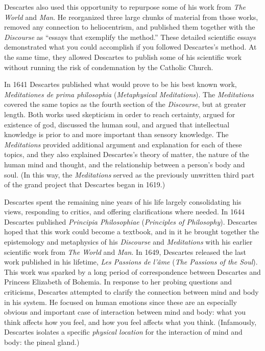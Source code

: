 Descartes also used this opportunity to repurpose some of his work from \textit{The World} and \textit{Man}. He reorganized three large chunks of material from those works, removed any connection to heliocentrism, and published them together with the \textit{Discourse} as ``essays that exemplify the method.'' These detailed scientific essays demonstrated what you could accomplish if you followed Descartes's method. At the same time, they allowed Descartes to publish some of his scientific work without running the risk of condemnation by the Catholic Church.

In 1641 Descartes published what would prove to be his best known work, \textit{Meditationes de prima philosophia} (\textit{Metaphysical Meditations}). The \textit{Meditations} covered the same topics as the fourth section of the \textit{Discourse}, but at greater length. Both works used skepticism in order to reach certainty, argued for existence of god, discussed the human soul, and argued that intellectual knowledge is prior to and more important than sensory knowledge. The \textit{Meditations} provided additional argument and explanation for each of these topics, and they also explained Descartes's theory of matter, the nature of the human mind and thought, and the relationship between a person's body and soul. (In this way, the \textit{Meditations} served as the previously unwritten third part of the grand project that Descartes began in 1619.)

Descartes spent the remaining nine years of his life largely consolidating his views, responding to critics, and offering clarifications where needed. In 1644 Descartes published \textit{Principia Philosophiae} (\textit{Principles of Philosophy}). Descartes hoped that this work could become a textbook, and in it he brought together the epistemology and metaphysics of his \textit{Discourse} and \textit{Meditations} with his earlier scientific work from \textit{The World} and \textit{Man}. In 1649, Descartes released the last work published in his lifetime, \textit{Les Passions de l'âme} (\textit{The Passions of the Soul}). This work was sparked by a long period of correspondence between Descartes and Princess Elizabeth of Bohemia. In response to her probing questions and criticisms, Descartes attempted to clarify the connection between mind and body in his system. He focused on human emotions since these are an especially obvious and important case of interaction between mind and body: what you think affects how you feel, and how you feel affects what you think. (Infamously, Descartes isolates a specific \textit{physical location} for the interaction of mind and body: the pineal gland.)

